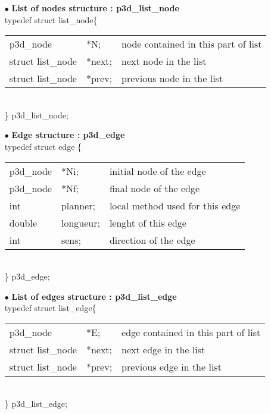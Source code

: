\begin{itemize}
\item[$\bullet$]{\bf List of nodes structure : p3d\_list\_node}
\\

typedef struct list\_node\{\\
\begin{tabular}{l l l}
  p3d\_node & *N; & node contained in this part of list\\
  struct list\_node & *next; & next node in the list\\
  struct list\_node & *prev; & previous node in the list\\
\end{tabular}\\
\} p3d\_list\_node;\\

\item[$\bullet$]{\bf Edge structure : p3d\_edge}
\\

typedef struct edge \{\\
\begin{tabular}{l l l}
  p3d\_node  & *Ni; & initial node of the edge\\
  p3d\_node  & *Nf; & final node of the edge\\
  int        & planner; & local method used for this edge\\
  double     & longueur; & lenght of this edge\\
  int & sens; & direction of the edge\\
\end{tabular}\\
\} p3d\_edge;\\


\item[$\bullet$]{\bf List of edges structure : p3d\_list\_edge}
\\

typedef struct list\_edge\{\\
\begin{tabular}{l l l}
  p3d\_node & *E; & edge contained in this part of list\\
  struct list\_node & *next; & next edge in the list\\
  struct list\_node & *prev; & previous edge in the list\\
\end{tabular}\\
\} p3d\_list\_edge;\\


\end{itemize}
